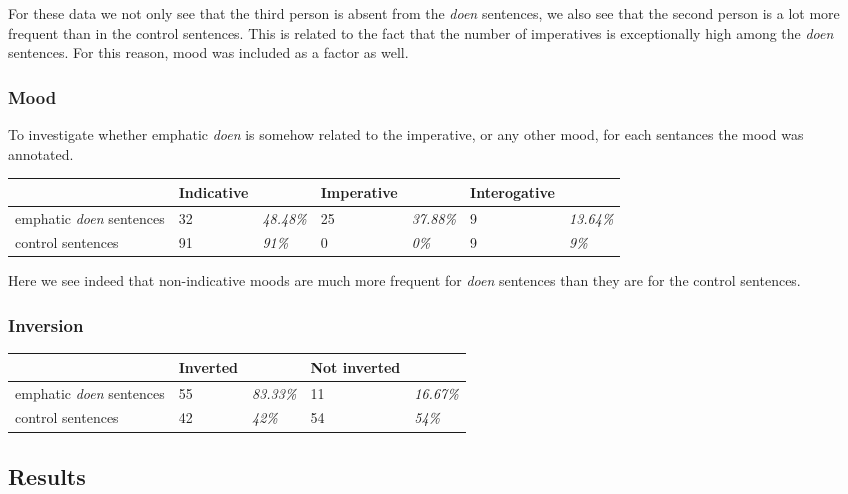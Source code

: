 \documentclass[12pt]{article}
\begin{document}
For these data we not only see that the third person is absent from the \emph{doen} sentences, we also see that the second person is a lot more frequent than in the control sentences. This is related to the fact that the number of imperatives is exceptionally high among the \emph{doen} sentences. For this reason, mood was included as a factor as well.


\subsubsection{Mood}

To investigate whether emphatic \emph{doen} is somehow related to the imperative, or any other mood, for each sentances the mood was annotated.

\begin{table}[h]
\begin{tabular}{|l|ll|ll|ll|}
\hline
&Indicative&&Imperative&&Interogative&\\
\hline
emphatic \emph{doen} sentences	&32 	& \emph{48.48\%}	&25		&\emph{37.88\%} & 9 &\emph{13.64\%}\\
control sentences				&91		& \emph{91\%}	&0	 	&\emph{0\%} & 9 &\emph{9\%}\\
\hline
\end{tabular}
\end{table}

Here we see indeed that non-indicative moods are much more frequent for \emph{doen} sentences than they are for the control sentences.


\subsubsection{Inversion}

\begin{table}[h]
\begin{tabular}{|l|ll|ll|}
\hline
&Inverted&&Not inverted&\\
\hline
emphatic \emph{doen} sentences	&55 	& \emph{83.33\%}	&11		 &\emph{16.67\%}\\
control sentences				&42		& \emph{42\%}	&54		 &\emph{54\%}\\
\hline
\end{tabular}
\end{table}


\subsection{Results}
\end{document}

